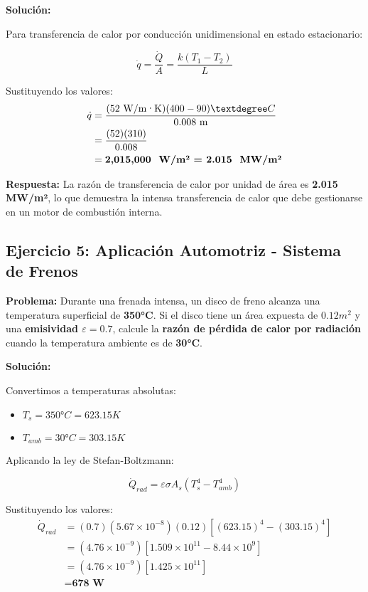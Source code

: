 \documentclass{article}
\begin{document}
    \textbf{Solución:}

    Para transferencia de calor por conducción unidimensional en estado estacionario:

    \begin{equation}
    \dot{q} = \frac{\dot{Q}}{A} = \frac{k(T_1 - T_2)}{L}
    \end{equation}

    Sustituyendo los valores:
    \begin{align}
    \dot{q} &= \frac{(52 \text{ W/m·K})(400 - 90)°C}{0.008 \text{ m}} \\
    &= \frac{(52)(310)}{0.008} \\
    &= \textbf{2,015,000 \text{ W/m²} = 2.015 \text{ MW/m²}}
    \end{align}

    \textbf{Respuesta:} La razón de transferencia de calor por unidad de área es \textbf{2.015 MW/m²}, lo que demuestra la intensa transferencia de calor que debe gestionarse en un motor de combustión interna.

    \subsection{Ejercicio 5: Aplicación Automotriz - Sistema de Frenos}

    \textbf{Problema:} Durante una frenada intensa, un disco de freno alcanza una temperatura superficial de \textbf{350°C}. Si el disco tiene un área expuesta de $0.12 m^2$ y una \textbf{emisividad $\varepsilon = 0.7$}, calcule la \textbf{razón de pérdida de calor por radiación} cuando la temperatura ambiente es de \textbf{30°C}.

    \textbf{Solución:}

    Convertimos a temperaturas absolutas:
    \begin{itemize}
        \item $T_s = 350°C = 623.15 K$
        \item $T_{amb} = 30°C = 303.15 K$
    \end{itemize}

    Aplicando la ley de Stefan-Boltzmann:

    \begin{equation}
    \dot{Q}_{rad} = \varepsilon\sigma A_s(T_s^4 - T_{amb}^4)
    \end{equation}

    Sustituyendo los valores:
    \begin{align}
    \dot{Q}_{rad} &= (0.7)(5.67 \times 10^{-8})(0.12)[(623.15)^4 - (303.15)^4] \\
    &= (4.76 \times 10^{-9})[1.509 \times 10^{11} - 8.44 \times 10^9] \\
    &= (4.76 \times 10^{-9})[1.425 \times 10^{11}] \\
    &= \textbf{678 W}
    \end{align}
\end{document}

